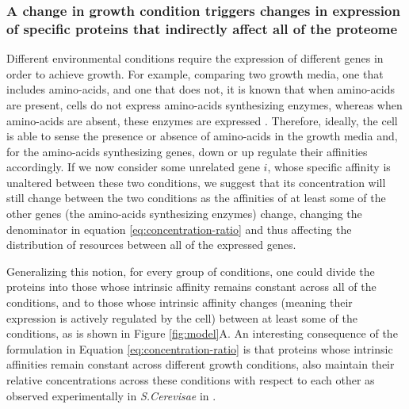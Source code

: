 \subsubsection{A change in growth condition triggers changes in expression of specific proteins that indirectly affect all of the proteome}
Different environmental conditions require the expression of different genes in order to achieve growth.
For example, comparing two growth media, one that includes amino-acids, and one that does not, it is known that when amino-acids are present, cells do not express amino-acids synthesizing enzymes, whereas when amino-acids are absent, these enzymes are expressed \cite{Gasch2000}.
Therefore, ideally, the cell is able to sense the presence or absence of amino-acids in the growth media and, for the amino-acids synthesizing genes, down or up regulate their affinities accordingly.
If we now consider some unrelated gene $i$, whose specific affinity is unaltered between these two conditions, we suggest that its concentration will still change between the two conditions as the affinities of at least some of the other genes (the amino-acids synthesizing enzymes) change, changing the denominator in equation \ref{eq:concentration-ratio} and thus affecting the distribution of resources between all of the expressed genes.


Generalizing this notion, for every group of conditions, one could divide the proteins into those whose intrinsic affinity remains constant across all of the conditions, and to those whose intrinsic affinity changes (meaning their expression is actively regulated by the cell) between at least some of the conditions, as is shown in Figure \ref{fig:model}A.
An interesting consequence of the formulation in Equation \ref{eq:concentration-ratio} is that proteins whose intrinsic affinities remain constant across different growth conditions, also maintain their relative concentrations across these conditions with respect to each other as observed experimentally in \emph{S.Cerevisae} in \cite{Keren2013}.